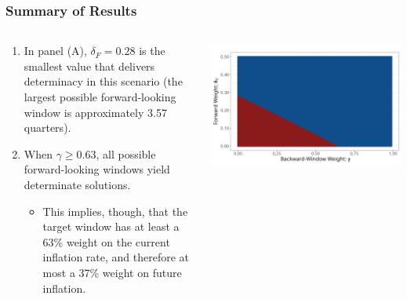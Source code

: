 \documentclass{beamer}
\begin{document}
\begin{frame}[allowframebreaks]
	\frametitle{Summary of Results}
	\begin{columns}
		\begin{column}{0.5\textwidth}
			\begin{enumerate}
				\setlength{\itemsep}{1em}
				\item In panel (A), $\delta_F =0.28$ is the smallest value that delivers determinacy in this scenario (the largest possible forward-looking window is approximately 3.57 quarters).
				\item When $\gamma \geq 0.63$, all possible forward-looking windows yield determinate solutions. 
				\begin{itemize}
					\item This implies, though, that the target window has at least a 63\% weight on the current inflation rate, and therefore at most a 37\% weight on future inflation.
				\end{itemize}
			\end{enumerate}
		\end{column}
		\begin{column}{0.5\textwidth}
			\begin{center}
				\includegraphics[width=\textwidth,height=\textheight,keepaspectratio]{../code/gamma_deltaF_notitle.png}
			\end{center}
		\end{column}
	\end{columns}
	

\end{frame}
\end{document}
